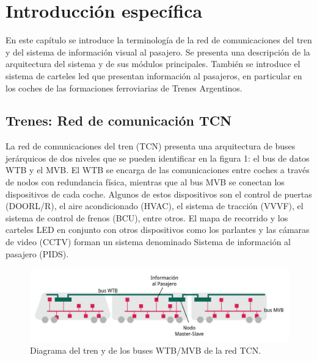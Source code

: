 \chapter{Introducción específica} %

\label{Chapter2}

En este capítulo se introduce la terminología de la red de comunicaciones del tren y del sistema de información visual al pasajero. Se presenta una descripción de la arquitectura del sistema y de sus módulos principales. También se introduce el sistema de carteles led que presentan información al pasajeros, en particular en los coches de las formaciones ferroviarias de Trenes Argentinos.\\



\section{Trenes: Red de comunicación TCN}

La red de comunicaciones del tren (TCN) presenta una arquitectura de buses jerárquicos de dos niveles que se pueden identificar en la figura 1: el bus de datos WTB y el MVB\cite{IEC-61375-1999}. El WTB se encarga de las comunicaciones entre coches a través de nodos con redundancia física, mientras que al bus MVB se conectan los dispositivos de cada coche. Algunos de estos dispositivos son el control de puertas (DOORL/R), el aire acondicionado (HVAC), el sistema de tracción (VVVF), el sistema de control de frenos (BCU), entre otros. El mapa de recorrido y los carteles LED en conjunto con otros dispositivos como los parlantes y las cámaras de video (CCTV) forman un sistema denominado Sistema de información al pasajero (PIDS).



\begin{figure}[ht]
	\centering
	\includegraphics[width=1\textwidth]{./Figures/diagramaRedTCN.png}
	\caption{Diagrama del tren y de los buses WTB/MVB de la red TCN.}
	\label{fig:redTCN}
\end{figure}


